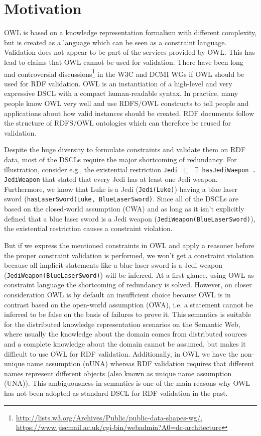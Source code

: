 \documentclass{llncs}
\newcommand{\ms}[1]{\texttt{#1}}
\begin{document}
\section{Motivation}

OWL is based on a knowledge representation formalism with different complexity, but is created as a language which can be seen as a constraint language.
Validation does not appear to be part of the services provided by OWL.  
This has lead to claims that OWL cannot be used for validation. 
There have been long and controversial discussions\footnote{\url{http://lists.w3.org/Archives/Public/public-data-shapes-wg/}, \url{https://www.jiscmail.ac.uk/cgi-bin/webadmin?A0=dc-architecture}} in the W3C and DCMI WGs if OWL should be used for RDF validation.
OWL is an instantiation of a high-level and very expressive DSCL with a compact human-readable syntax.
In practice, many people know OWL very well and use RDFS/OWL constructs to tell people and applications about how valid instances should be created.
RDF documents follow the structure of RDFS/OWL ontologies which can therefore be reused for validation.

Despite the huge diversity to formulate constraints and validate them on RDF data, most of the DSCLs require the major shortcoming of redundancy. For illustration, consider e.g., the existential restriction \ms{Jedi $\sqsubseteq$ $\exists$ hasJediWaepon . JediWeapon} that stated that every Jedi has at least one Jedi weapon. Furthermore, we know that Luke is a Jedi (\ms{Jedi(Luke)}) having a blue laser sword (\ms{hasLaserSword(Luke, BlueLaserSword)}. Since all of the DSCLs are based on the closed-world assumption (CWA) and as long as it isn't explicitly defined that a blue laser sword is a Jedi weapon (\ms{JediWeapon(BlueLaserSword)}), the existential restriction causes a constraint violation.

But if we express the mentioned constraints in OWL and apply a reasoner before the proper constraint validation is performed, we won't get a constraint violation because all implicit statements like a blue laser sword is a Jedi weapon (\ms{JediWeapon(BlueLaserSword)}) will be inferred. At a first glance, using OWL as constraint language the shortcoming of redundancy is solved. However, on closer consideration OWL is by default an insufficient choice because OWL is in contrast based on the open-world assumption (OWA), i.e. a statement cannot be inferred to be false on the basis of failures to prove it. 
This semantics is suitable for the distributed knowledge representation scenarios on the Semantic Web, 
where usually the knowledge about the domain comes from distributed
sources and a complete knowledge about the domain cannot be assumed, 
but makes it difficult to use OWL for RDF validation.
Additionally, in OWL we have the non-unique name assumption (nUNA) whereas RDF validation requires that different names represent different objects (also known as unique name assumption (UNA)).
This ambiguousness in semantics is one of the main reasons why OWL has not been adopted as standard DSCL for RDF validation in the past. 
\end{document}
